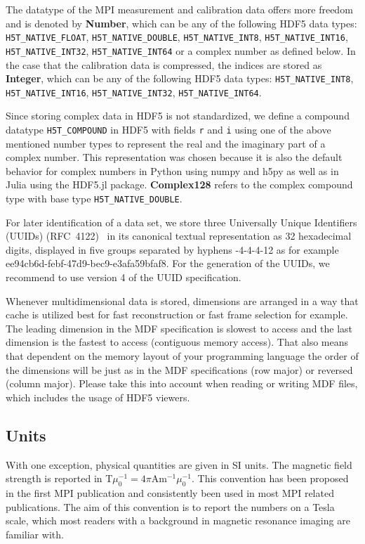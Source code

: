 \documentclass[landscape,a4paper]{article} %
\newcommand{\inl}[1]{\lstinline[columns=fixed]{#1}}
\newcommand{\inltab}[1]{{\ttfamily\bfseries\color{blue}#1}}
\newcommand{\inlvar}[1]{{\ttfamily#1}}
\begin{document}
\begin{multicols}{2}
The datatype of the MPI measurement and calibration data offers more freedom and is denoted by \inltab{Number}, which can be any of the following HDF5 data types: \inl{H5T_NATIVE_FLOAT}, \mbox{\inl{H5T_NATIVE_DOUBLE},} \mbox{\inl{H5T_NATIVE_INT8},} \inl{H5T_NATIVE_INT16}, \inl{H5T_NATIVE_INT32}, \inl{H5T_NATIVE_INT64} or a complex number as defined below. In the case that the calibration data is compressed, the indices are stored as \inltab{Integer}, which can be any of the following HDF5 data types: \mbox{\inl{H5T_NATIVE_INT8},} \inl{H5T_NATIVE_INT16}, \inl{H5T_NATIVE_INT32}, \inl{H5T_NATIVE_INT64}.

Since storing complex data in HDF5 is not standardized, we define a compound datatype \inl{H5T_COMPOUND} in HDF5 with fields \inl{r} and \inl{i} using one of the above mentioned number types to represent the real and the imaginary part of a complex number. This representation was chosen because it is also the default behavior for complex numbers in Python using numpy and h5py as well as in Julia using the HDF5.jl package. \inltab{Complex128} refers to the complex compound type with base type \inl{H5T_NATIVE_DOUBLE}.

For later identification of a data set, we store three Universally Unique Identifiers (UUIDs) (RFC~4122)~\cite{leach2005universally} in its canonical textual representation as 32 hexadecimal digits, displayed in five groups separated by hyphens \inlvar{8-4-4-4-12} as for example \inlvar{ee94cb6d-febf-47d9-bec9-e3afa59bfaf8}. For the generation of the UUIDs, we recommend to use version 4 of the UUID specification.

Whenever multidimensional data is stored, dimensions are arranged in a way that cache is utilized best for fast reconstruction or fast frame selection for example. The leading dimension in the MDF specification is slowest to access and the last dimension is the fastest to access (contiguous memory access). That also means that dependent on the memory layout of your programming language the order of the dimensions will be just as in the MDF specifications (row major) or reversed (column major). Please take this into account when reading or writing MDF files, which includes the usage of HDF5 viewers.

\subsection{Units}

With one exception, physical quantities are given in SI units. The magnetic field strength is reported in T$\mu_0^{-1} = 4 \pi$Am$^{-1}\mu_0^{-1}$. This convention has been proposed in the first MPI publication \cite{Gleich2005} and consistently been used in most MPI related publications. The aim of this convention is to report the numbers on a Tesla scale, which most readers with a background in magnetic resonance imaging are familiar with.


\end{multicols}
\end{document}
